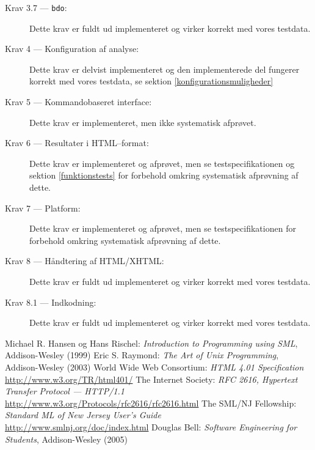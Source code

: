 \documentclass[a4paper,oneside]{memoir}
\begin{document}
\begin{description}
\item[Krav 3.7 --- \texttt{bdo}:] Dette
  krav er fuldt ud implementeret og virker korrekt med vores testdata.
\item[Krav 4 --- Konfiguration af analyse:] Dette krav er delvist
  implementeret og den implementerede del fungerer korrekt med vores
  testdata, se sektion \ref{konfigurationsmuligheder}
\item[Krav 5 --- Kommandobaseret interface:] Dette krav er
  implementeret, men ikke systematisk afprøvet.
\item[Krav 6 --- Resultater i HTML--format:] Dette krav er
  implementeret og afprøvet, men se testspecifikationen og sektion
  \ref{funktionstests} for forbehold omkring systematisk afprøvning af
  dette.
\item[Krav 7 --- Platform:] Dette krav er implementeret og afprøvet,
  men se testspecifikationen for forbehold omkring systematisk
  afprøvning af dette.
\item[Krav 8 --- Håndtering af HTML/XHTML:] Dette krav er fuldt ud
  implementeret og virker korrekt med vores testdata.
\item[Krav 8.1 --- Indkodning:] Dette krav er fuldt ud implementeret
  og virker korrekt med vores testdata.
\end{description}

\begin{thebibliography}{9}
 Michael R. Hansen og Hans Rischel: {\em
  Introduction to Programming using SML}, Addison-Wesley (1999)
 Eric S. Raymond: {\em
  The Art of Unix Programming}, Addison-Wesley (2003)
 World Wide Web Consortium: {\em HTML 4.01
  Specification}\\ \url{http://www.w3.org/TR/html401/}
 The Internet Society: {\em RFC 2616, Hypertext Transfer Protocol --- HTTP/1.1}\\
  \url{http://www.w3.org/Protocols/rfc2616/rfc2616.html}
 The SML/NJ Fellowship: {\em Standard ML of New
  Jersey User's Guide}\\ 
  \url{http://www.smlnj.org/doc/index.html}
 Douglas Bell: {\em Software Engineering for Students},
  Addison-Wesley (2005)
\end{thebibliography}
\end{document}

